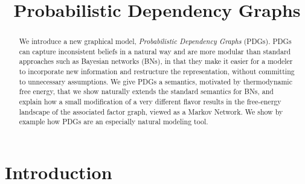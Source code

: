 \documentclass{article}
\title{Probabilistic Dependency Graphs}
\author{} %
\numberwithin{equation}{section}
\begin{document}
	\maketitle
	
	\begin{abstract}
We introduce a new graphical model, \emph{Probabilistic Dependency
 Graphs} (PDGs). PDGs can capture inconsistent 
                beliefs in a natural way and are more modular than
                standard approaches such as Bayesian networks (BNs),
                in that they make it easier for a modeler to
                incorporate new information and restructure the
                representation, without committing to unnecessary
                assumptions.
            		We give PDGs a semantics, motivated by thermodynamic
                free energy, that we show naturally extends the
                standard semantics for BNs, and explain how a small
                modification of a very different flavor results in the
                free-energy landscape of the associated factor graph,
                viewed as a Markov Network. 
		We show by example how PDGs are an especially natural modeling tool.
	\end{abstract}


	\section{Introduction}
\end{document}
